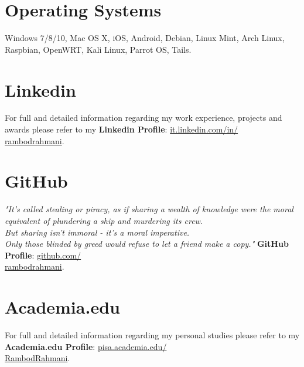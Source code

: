 \documentclass[]{friggeri-cv} %
\begin{document}
\begin{aside}\vspace{-2.75cm}
\section{Operating Systems}
Windows 7/8/10, Mac OS X, iOS, Android, Debian, Linux Mint, Arch Linux, Raspbian, OpenWRT, Kali Linux, Parrot OS, Tails.\vspace{6mm}
\section{Linkedin \textcolor{blue}{\faLinkedinSquare}}
For full and detailed information regarding my work experience, projects and awards please refer to my \textbf{Linkedin Profile}: \href{http://it.linkedin.com/in/rambodrahmani}{{it.linkedin.com/in/}}\\\href{http://it.linkedin.com/in/rambodrahmani}{{rambodrahmani}}.\vspace{6mm}
\section{GitHub \textcolor{teal}{\faGithub}}
\emph{"It’s called stealing or piracy, as if sharing a wealth of knowledge were the moral equivalent of plundering a ship and murdering its crew.\\But sharing isn’t immoral - it’s a moral imperative.\\Only those blinded by greed would refuse to let a friend make a copy."}\vspace{1mm}
\textbf{GitHub Profile}: \href{http://github.com/rambodrahmani}{{github.com/}}\\\href{http://github.com/rambodrahmani}{{rambodrahmani}}.\vspace{6mm}
\section{Academia.edu \textcolor{orange}{\faUniversity}}
For full and detailed information regarding my personal studies please refer to my \textbf{Academia.edu Profile}: \href{http://pisa.academia.edu/RambodRahmani}{{pisa.academia.edu/}}\\\href{http://pisa.academia.edu/RambodRahmani}{{RambodRahmani}}.\vspace{6mm}
\end{aside}
\end{document}
